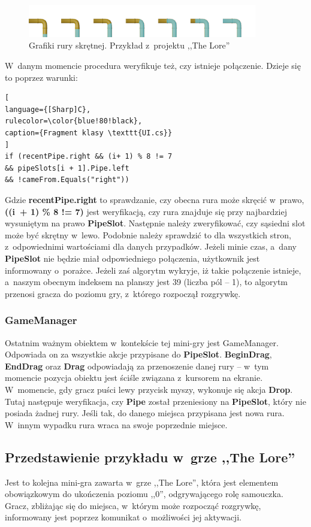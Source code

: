 \documentclass[oneside,polski,logo]{amuthesis}
\begin{document}
\begin{figure}[h]
	\centering
	\includegraphics[width=10cm]{images/tyrek/rury-5.png}
	\caption{Grafiki rury skrętnej. Przykład z~projektu ,,The Lore''}
\end{figure}
W~danym momencie procedura weryfikuje też, czy istnieje połączenie. Dzieje się to poprzez warunki:
\begin{lstlisting}[
language={[Sharp]C},
rulecolor=\color{blue!80!black},
caption={Fragment klasy \texttt{UI.cs}}
]
if (recentPipe.right && (i+ 1) % 8 != 7 
&& pipeSlots[i + 1].Pipe.left 
&& !cameFrom.Equals("right"))
\end{lstlisting}
Gdzie \textbf{recentPipe.right} to sprawdzanie, czy obecna rura może skręcić w~prawo, \textbf{((i~+ 1) \% 8 != 7)} jest weryfikacją, czy rura znajduje się przy najbardziej wysuniętym na prawo \textbf{PipeSlot}. Następnie należy zweryfikować, czy sąsiedni slot może być skrętny w~lewo. Podobnie należy sprawdzić to dla wszystkich stron, z~odpowiednimi wartościami dla danych przypadków. Jeżeli minie czas, a~dany \textbf{PipeSlot} nie będzie miał odpowiedniego połączenia, użytkownik jest informowany o~porażce. Jeżeli zaś algorytm wykryje, iż takie połączenie istnieje, a~naszym obecnym indeksem na planszy jest 39 (liczba pól – 1), to algorytm przenosi gracza do poziomu gry, z~którego rozpoczął rozgrywkę.

\subsubsection{GameManager}
\par Ostatnim ważnym obiektem w~kontekście tej mini-gry jest GameManager. Odpowiada on za wszystkie akcje przypisane do \textbf{PipeSlot}. \textbf{BeginDrag}, \textbf{EndDrag} oraz \textbf{Drag} odpowiadają za przenoszenie danej rury – w~tym momencie pozycja obiektu jest ściśle związana z~kursorem na ekranie. W~momencie, gdy gracz puści lewy przycisk myszy, wykonuje się akcja \textbf{Drop}. Tutaj następuje weryfikacja, czy \textbf{Pipe} został przeniesiony na \textbf{PipeSlot}, który nie posiada żadnej rury. Jeśli tak, do danego miejsca przypisana jest nowa rura. W~innym wypadku rura wraca na swoje poprzednie miejsce. 
\subsection{Przedstawienie przykładu w~grze ,,The Lore''}
\par Jest to kolejna mini-gra zawarta w~grze ,,The Lore'', która jest elementem obowiązkowym do ukończenia poziomu ,,0'', odgrywającego rolę samouczka. Gracz, zbliżając się do miejsca, w~którym może rozpocząć rozgrywkę, informowany jest poprzez komunikat o~możliwości jej aktywacji.
\end{document}
